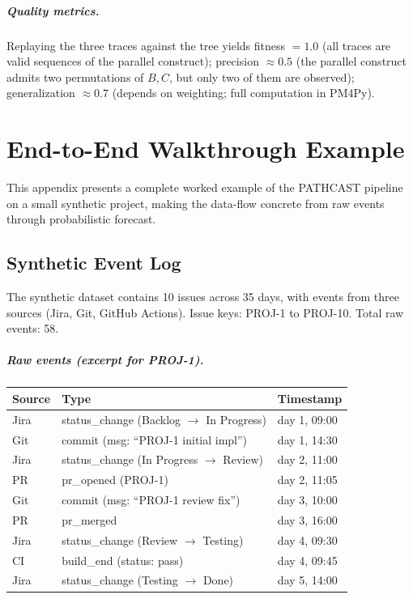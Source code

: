 \paragraph{Quality metrics.} Replaying the three traces against the tree
yields fitness $= 1.0$ (all traces are valid sequences of the parallel
construct); precision $\approx 0.5$ (the parallel construct admits two
permutations of $B, C$, but only two of them are observed); generalization
$\approx 0.7$ (depends on weighting; full computation in PM4Py).


\chapter{End-to-End Walkthrough Example}
\label{app:D}

This appendix presents a complete worked example of the PATHCAST pipeline
on a small synthetic project, making the data-flow concrete from raw
events through probabilistic forecast.


\section{Synthetic Event Log}
\label{app:D-log}

The synthetic dataset contains 10 issues across 35 days, with events from
three sources (Jira, Git, GitHub Actions). Issue keys: PROJ-1 to PROJ-10.
Total raw events: 58.

\paragraph{Raw events (excerpt for PROJ-1).}
\begin{center}
\small
\begin{tabular}{lll}
\toprule
\textbf{Source} & \textbf{Type} & \textbf{Timestamp} \\
\midrule
Jira  & status\_change (Backlog $\to$ In Progress) & day 1, 09:00 \\
Git   & commit (msg: ``PROJ-1 initial impl'')      & day 1, 14:30 \\
Jira  & status\_change (In Progress $\to$ Review)  & day 2, 11:00 \\
PR    & pr\_opened (PROJ-1)                        & day 2, 11:05 \\
Git   & commit (msg: ``PROJ-1 review fix'')        & day 3, 10:00 \\
PR    & pr\_merged                                 & day 3, 16:00 \\
Jira  & status\_change (Review $\to$ Testing)      & day 4, 09:30 \\
CI    & build\_end (status: pass)                  & day 4, 09:45 \\
Jira  & status\_change (Testing $\to$ Done)        & day 5, 14:00 \\
\bottomrule
\end{tabular}
\end{center}

